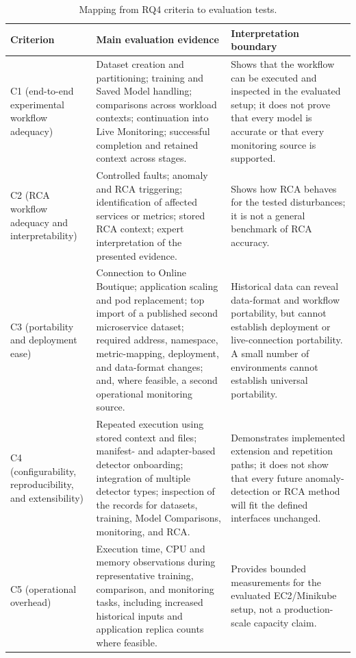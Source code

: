 \begin{table}[H]
    \centering
    \caption{Mapping from RQ4 criteria to evaluation tests.}
    \label{tab:rq4_test_mapping}
    \scriptsize
    \begin{tabular}{@{}p{} p{} p{}@{}}
        \toprule
        \textbf{Criterion} & \textbf{Main evaluation evidence} & \textbf{Interpretation boundary} \\
        \midrule
        C1 (end-to-end experimental workflow adequacy) & Dataset creation and partitioning; training and Saved Model handling; comparisons across workload contexts; continuation into Live Monitoring; successful completion and retained context across stages. & Shows that the workflow can be executed and inspected in the evaluated setup; it does not prove that every model is accurate or that every monitoring source is supported. \\
        C2 (RCA workflow adequacy and interpretability) & Controlled faults; anomaly and RCA triggering; identification of affected services or metrics; stored RCA context; expert interpretation of the presented evidence. & Shows how RCA behaves for the tested disturbances; it is not a general benchmark of RCA accuracy. \\
        C3 (portability and deployment ease) & Connection to Online Boutique; application scaling and pod replacement; top import of a published second microservice dataset; required address, namespace, metric-mapping, deployment, and data-format changes; and, where feasible, a second operational monitoring source. & Historical data can reveal data-format and workflow portability, but cannot establish deployment or live-connection portability. A small number of environments cannot establish universal portability. \\
        C4 (configurability, reproducibility, and extensibility) & Repeated execution using stored context and files; manifest- and adapter-based detector onboarding; integration of multiple detector types; inspection of the records for datasets, training, Model Comparisons, monitoring, and RCA. & Demonstrates implemented extension and repetition paths; it does not show that every future anomaly-detection or RCA method will fit the defined interfaces unchanged. \\
        C5 (operational overhead) & Execution time, CPU and memory observations during representative training, comparison, and monitoring tasks, including increased historical inputs and application replica counts where feasible. & Provides bounded measurements for the evaluated EC2/Minikube setup, not a production-scale capacity claim. \\
        \bottomrule
    \end{tabular}
\end{table}

